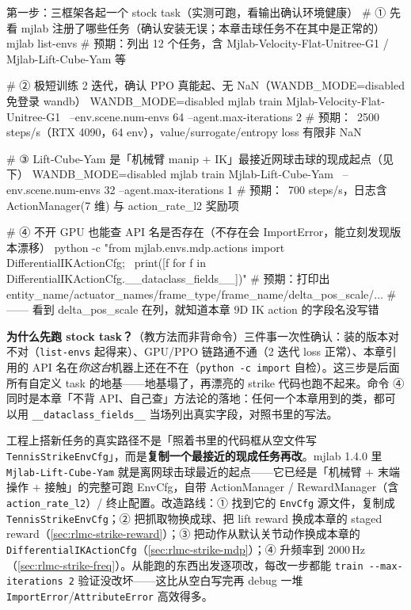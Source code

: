 \begin{codebox}[bash]{第一步：三框架各起一个 stock task（实测可跑，看输出确认环境健康）}
# ① 先看 mjlab 注册了哪些任务（确认安装无误；本章击球任务不在其中是正常的）
mjlab list-envs
#   预期：列出 12 个任务，含 Mjlab-Velocity-Flat-Unitree-G1 / Mjlab-Lift-Cube-Yam 等

# ② 极短训练 2 迭代，确认 PPO 真能起、无 NaN（WANDB_MODE=disabled 免登录 wandb）
WANDB_MODE=disabled mjlab train Mjlab-Velocity-Flat-Unitree-G1 \
    --env.scene.num-envs 64 --agent.max-iterations 2
#   预期：~2500 steps/s（RTX 4090，64 env），value/surrogate/entropy loss 有限非 NaN

# ③ Lift-Cube-Yam 是「机械臂 manip + IK」最接近网球击球的现成起点（见下）
WANDB_MODE=disabled mjlab train Mjlab-Lift-Cube-Yam \
    --env.scene.num-envs 32 --agent.max-iterations 1
#   预期：~700 steps/s，日志含 ActionManager(7 维) 与 action_rate_l2 奖励项

# ④ 不开 GPU 也能查 API 名是否存在（不存在会 ImportError，能立刻发现版本漂移）
python -c "from mjlab.envs.mdp.actions import DifferentialIKActionCfg; \
print([f for f in DifferentialIKActionCfg.__dataclass_fields__])"
#   预期：打印出 entity_name/actuator_names/frame_type/frame_name/delta_pos_scale/...
#         —— 看到 delta_pos_scale 在列，就知道本章 9D IK action 的字段名没写错
\end{codebox}

\noindent{}\textbf{为什么先跑 stock task？}（教方法而非背命令）三件事一次性确认：装的版本对不对（\verb|list-envs| 起得来）、GPU/PPO 链路通不通（2 迭代 loss 正常）、本章引用的 API 名在\emph{你这台}机器上还在不在（\verb|python -c import| 自检）。这三步是后面所有自定义 task 的地基——地基塌了，再漂亮的 strike 代码也跑不起来。命令 ④ 同时是本章「不背 API、自己查」方法论的落地：任何一个本章用到的类，都可以用 \verb|__dataclass_fields__| 当场列出真实字段，对照书里的写法。

\begin{insight}\label{ins:rlmc-strike-retrofit}
工程上搭新任务的真实路径不是「照着书里的代码框从空文件写 \texttt{TennisStrikeEnvCfg}」，而是\textbf{复制一个最接近的现成任务再改}。mjlab 1.4.0 里 \verb|Mjlab-Lift-Cube-Yam| 就是离网球击球最近的起点——它已经是「机械臂 $+$ 末端操作 $+$ 接触」的完整可跑 EnvCfg，自带 ActionManager / RewardManager（含 \verb|action_rate_l2|）/ 终止配置。改造路线：① 找到它的 \verb|EnvCfg| 源文件，复制成 \verb|TennisStrikeEnvCfg|；② 把抓取物换成球、把 lift reward 换成本章的 staged reward（\cref{sec:rlmc-strike-reward}）；③ 把动作从默认关节动作换成本章的 \verb|DifferentialIKActionCfg|（\cref{sec:rlmc-strike-mdp}）；④ 升频率到 2000\,Hz（\cref{sec:rlmc-strike-freq}）。从能跑的东西出发逐项改，每改一步都能 \verb|train --max-iterations 2| 验证没改坏——这比从空白写完再 debug 一堆 \verb|ImportError|/\verb|AttributeError| 高效得多。
\end{insight}

